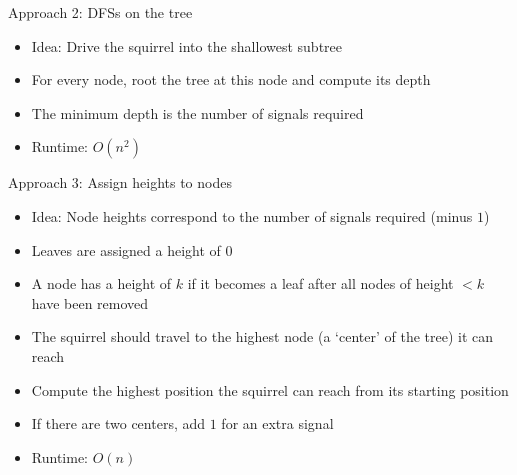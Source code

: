 \begin{slide}
%        
    \begin{block}{Approach 2: DFSs on the tree}
        \begin{itemize}
        \item Idea: Drive the squirrel into the shallowest subtree
        \item For every node, root the tree at this node and compute its depth
        \item The minimum depth is the number of signals required
        \item Runtime: $O(n^2)$
        \end{itemize}
    \end{block}
\end{slide}


\begin{slide}
%        
    \begin{block}{Approach 3: Assign heights to nodes}
        \begin{itemize}
        \item Idea: Node heights correspond to the number of signals required (minus $1$)
        \item Leaves are assigned a height of $0$
        \item A node has a height of $k$ if it becomes a leaf after all nodes of height $< k$ have been removed
        \item The squirrel should travel to the highest node (a `center' of the tree) it can reach
        \item Compute the highest position the squirrel can reach from its starting position
        \item If there are two centers, add $1$ for an extra signal
        \item Runtime: $O(n)$
        \end{itemize}
    \end{block}
\end{slide}